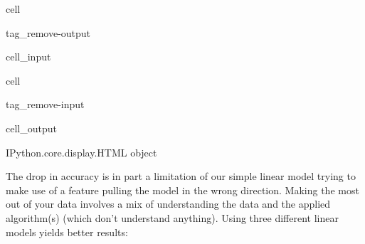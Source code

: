 \documentclass[letterpaper,10pt,english]{jupyterBook}
\begin{document}
\begin{sphinxuseclass}{cell}
\begin{sphinxuseclass}{tag_remove-output}\begin{sphinxVerbatimInput}

\begin{sphinxuseclass}{cell_input}
\begin{sphinxVerbatim}[commandchars=\\\{\}]
   

  \PYG{p}{[}\PYG{p}{]} \PYG{p}{[}\PYG{p}{]} 
\end{sphinxVerbatim}

\end{sphinxuseclass}\end{sphinxVerbatimInput}

\end{sphinxuseclass}
\end{sphinxuseclass}
\begin{sphinxuseclass}{cell}
\begin{sphinxuseclass}{tag_remove-input}\begin{sphinxVerbatimOutput}

\begin{sphinxuseclass}{cell_output}
\begin{sphinxVerbatim}[commandchars=\\\{\}]
\PYGZlt{}IPython.core.display.HTML object\PYGZgt{}
\end{sphinxVerbatim}

\end{sphinxuseclass}\end{sphinxVerbatimOutput}

\end{sphinxuseclass}
\end{sphinxuseclass}
\sphinxAtStartPar
The drop in accuracy is in part a limitation of our simple linear model trying to make use of a feature pulling the model in the wrong direction. Making the most out of your data involves a mix of understanding the data and the applied algorithm(s) (which don’t understand anything). Using three different linear models yields better results:
\end{document}
